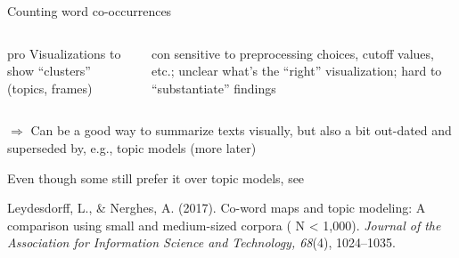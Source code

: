 \documentclass{beamer}
\begin{document}
\begin{frame}[plain]
\end{frame}






\begin{frame}{Counting word co-occurrences}
	
	
	\begin{columns}[t]
		\begin{exampleblock}{pro}
			Visualizations to show ``clusters'' (topics, frames)
		\end{exampleblock}
		\begin{alertblock}{con}
		sensitive to preprocessing choices, cutoff values, etc.; unclear what's the ``right'' visualization; hard to ``substantiate'' findings
		\end{alertblock}
	\end{columns}
	
	
	$\Rightarrow$ Can be a good way to summarize texts visually, but also a bit out-dated and superseded by, e.g., topic models (more later)

\tiny
Even though some still prefer it over topic models, see

Leydesdorff, L., \& Nerghes, A. (2017). Co-word maps and topic modeling: A comparison using small and medium-sized corpora ( N < 1,000). \textit{Journal of the Association for Information Science and Technology, 68}(4), 1024–1035. %
\end{frame}
\end{document}
